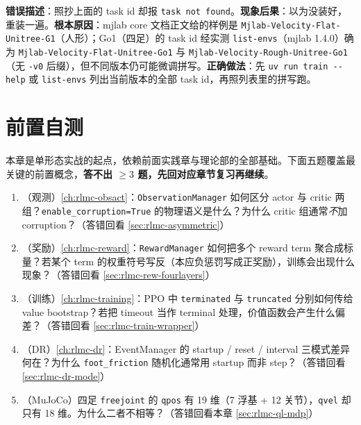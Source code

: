 \begin{pitfall}
\textbf{错误描述}：照抄上面的 task id 却报 \verb|task not found|。\textbf{现象后果}：以为没装好，重装一遍。\textbf{根本原因}：mjlab core 文档正文给的样例是 \verb|Mjlab-Velocity-Flat-Unitree-G1|（人形）；Go1（四足）的 task id 经实测 \verb|list-envs|（mjlab 1.4.0）确为 \verb|Mjlab-Velocity-Flat-Unitree-Go1| 与 \verb|Mjlab-Velocity-Rough-Unitree-Go1|（无 \texttt{-v0} 后缀），但不同版本仍可能微调拼写。\textbf{正确做法}：先 \verb|uv run train --help| 或 \verb|list-envs| 列出当前版本的全部 task id，再照列表里的拼写跑。
\end{pitfall}

\section{前置自测}
\label{sec:rlmc-ql-pretest}

本章是单形态实战的起点，依赖前面实践章与理论部的全部基础。下面五题覆盖最关键的前置概念，\textbf{答不出 $\ge 3$ 题，先回对应章节复习再继续}。

\begin{practice}[开课前自测]
\begin{enumerate}
\item （观测）\cref{ch:rlmc-obsact}：\verb|ObservationManager| 如何区分 actor 与 critic 两组？\verb|enable_corruption=True| 的物理语义是什么？为什么 critic 组通常\emph{不}加 corruption？（答错回看 \cref{sec:rlmc-asymmetric}）
\item （奖励）\cref{ch:rlmc-reward}：\verb|RewardManager| 如何把多个 reward term 聚合成标量？若某个 term 的权重符号写反（本应负惩罚写成正奖励），训练会出现什么现象？（答错回看 \cref{sec:rlmc-rew-fourlayers}）
\item （训练）\cref{ch:rlmc-training}：PPO 中 \verb|terminated| 与 \verb|truncated| 分别如何传给 value bootstrap？若把 timeout 当作 terminal 处理，价值函数会产生什么偏差？（答错回看 \cref{sec:rlmc-train-wrapper}）
\item （DR）\cref{ch:rlmc-dr}：EventManager 的 startup / reset / interval 三模式差异何在？为什么 \verb|foot_friction| 随机化通常用 startup 而非 step？（答错回看 \cref{sec:rlmc-dr-mode}）
\item （MuJoCo）四足 \verb|freejoint| 的 \verb|qpos| 有 19 维（7 浮基 + 12 关节），\verb|qvel| 却只有 18 维。为什么二者不相等？（答错回看本章 \cref{sec:rlmc-ql-mdp}）
\end{enumerate}
\end{practice}

